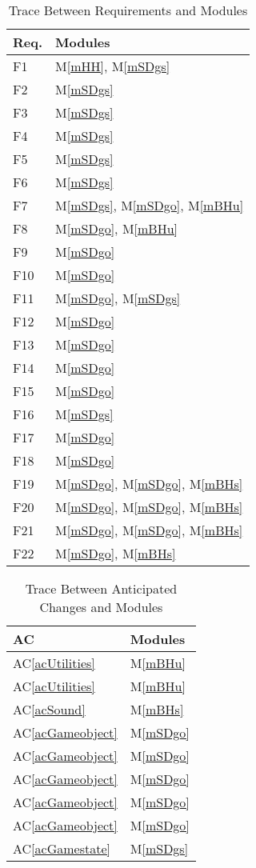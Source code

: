 \documentclass[12pt, titlepage]{article}
\newcommand{\acref}[1]{AC\ref{#1}}
\newcommand{\mref}[1]{M\ref{#1}}
\begin{document}
\begin{table}[H]
\centering
\begin{tabular}{p{} p{}}
\toprule
\textbf{Req.} & \textbf{Modules}\\
\midrule

F1 & \mref{mHH}, \mref{mSDgs}\\
F2 & \mref{mSDgs}\\
F3 & \mref{mSDgs}\\
F4 & \mref{mSDgs}\\
F5 & \mref{mSDgs}\\
F6 & \mref{mSDgs}\\
F7 & \mref{mSDgs}, \mref{mSDgo}, \mref{mBHu}\\
F8 & \mref{mSDgo}, \mref{mBHu}\\
F9 & \mref{mSDgo}\\
F10 & \mref{mSDgo}\\
F11 & \mref{mSDgo}, \mref{mSDgs}\\
F12 & \mref{mSDgo}\\
F13 & \mref{mSDgo}\\
F14 & \mref{mSDgo}\\
F15 & \mref{mSDgo}\\
F16 & \mref{mSDgs}\\
F17 & \mref{mSDgo}\\
F18 & \mref{mSDgo}\\
F19 & \mref{mSDgo}, \mref{mSDgo}, \mref{mBHs}\\
F20 & \mref{mSDgo}, \mref{mSDgo}, \mref{mBHs}\\
F21 & \mref{mSDgo}, \mref{mSDgo}, \mref{mBHs}\\
F22 & \mref{mSDgo}, \mref{mBHs}\\
\bottomrule
\end{tabular}
\caption{Trace Between Requirements and Modules}
\label{TblRT}
\end{table}

\begin{table}[H]
\centering
\begin{tabular}{p{} p{}}
\toprule
\textbf{AC} & \textbf{Modules}\\
\midrule
\acref{acUtilities} & \mref{mBHu}\\
\acref{acUtilities} & \mref{mBHu}\\
\acref{acSound} & \mref{mBHs}\\
\acref{acGameobject} & \mref{mSDgo}\\
\acref{acGameobject} & \mref{mSDgo}\\
\acref{acGameobject} & \mref{mSDgo}\\
\acref{acGameobject} & \mref{mSDgo}\\
\acref{acGameobject} & \mref{mSDgo}\\
\acref{acGamestate} & \mref{mSDgs}\\
\bottomrule
\end{tabular}
\caption{Trace Between Anticipated Changes and Modules}
\label{TblACT}
\end{table}
\end{document}
